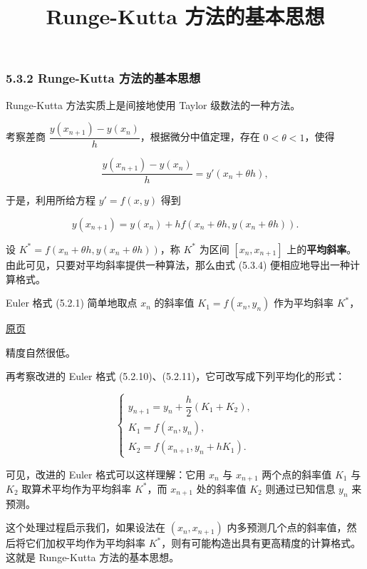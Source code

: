 \documentclass[
  10pt,
  fontset=fandol]{ctexart}
\title{Runge-Kutta 方法的基本思想}
\author{}
\date{}
\begin{document}
\maketitle

\subsubsection{5.3.2 Runge-Kutta 方法的基本思想}\label{runge-kutta-ux65b9ux6cd5ux7684ux57faux672cux601dux60f3}

Runge-Kutta 方法实质上是间接地使用 Taylor 级数法的一种方法。

考察差商 \(\dfrac{y(x_{n+1})-y(x_n)}{h}\)，根据微分中值定理，存在 \(0<\theta<1\)，使得

\[
\frac{y(x_{n+1})-y(x_n)}{h}=y'(x_n+\theta h),
\]

于是，利用所给方程 \(y'=f(x,y)\) 得到

\[
y(x_{n+1})=y(x_n)+hf(x_n+\theta h,y(x_n+\theta h)).\tag{5.3.4}
\]

设 \(K^*=f(x_n+\theta h,y(x_n+\theta h))\)，称 \(K^*\) 为区间 \([x_n,x_{n+1}]\) 上的\textbf{平均斜率}。由此可见，只要对平均斜率提供一种算法，那么由式 (5.3.4) 便相应地导出一种计算格式。

Euler 格式 (5.2.1) 简单地取点 \(x_n\) 的斜率值 \(K_1=f(x_n,y_n)\) 作为平均斜率 \(K^*\)，

\href{../../source-images/pdf-128.jpeg}{原页}

精度自然很低。

再考察改进的 Euler 格式 (5.2.10)、(5.2.11)，它可改写成下列平均化的形式：

\[
\begin{cases}
y_{n+1}=y_n+\dfrac{h}{2}(K_1+K_2),\\
K_1=f(x_n,y_n),\\
K_2=f(x_{n+1},y_n+hK_1).
\end{cases}
\]

可见，改进的 Euler 格式可以这样理解：它用 \(x_n\) 与 \(x_{n+1}\) 两个点的斜率值 \(K_1\) 与 \(K_2\) 取算术平均作为平均斜率 \(K^*\)，而 \(x_{n+1}\) 处的斜率值 \(K_2\) 则通过已知信息 \(y_n\) 来预测。

这个处理过程启示我们，如果设法在 \((x_n,x_{n+1})\) 内多预测几个点的斜率值，然后将它们加权平均作为平均斜率 \(K^*\)，则有可能构造出具有更高精度的计算格式。这就是 Runge-Kutta 方法的基本思想。
\end{document}

